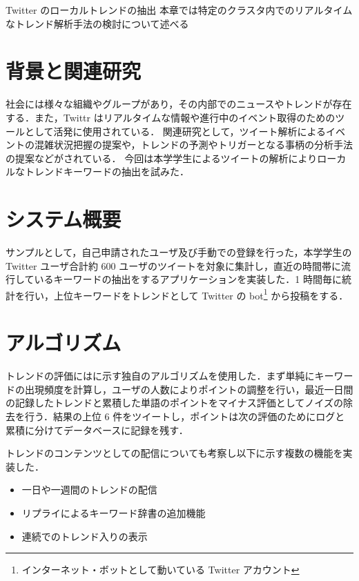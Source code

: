 \chapterhead
{Twitter のローカルトレンドの抽出}
{本章では特定のクラスタ内でのリアルタイムなトレンド解析手法の検討について述べる}


\section{背景と関連研究}

社会には様々な組織やグループがあり，その内部でのニュースやトレンドが存在する．また，Twittr はリアルタイムな情報や進行中のイベント取得のためのツールとして活発に使用されている．
関連研究として，ツイート解析によるイベントの混雑状況把握の提案\cite{socialevent}や，トレンドの予測やトリガーとなる事柄の分析手法の提案\cite{trendtrigger}などがされている．
今回は本学学生によるツイートの解析によりローカルなトレンドキーワードの抽出を試みた．

\section{システム概要}
サンプルとして，自己申請されたユーザ及び手動での登録を行った，本学学生の Twitter ユーザ合計約 600 ユーザのツイートを対象に集計し，直近の時間帯に流行しているキーワードの抽出をするアプリケーションを実装した．1 時間毎に統計を行い，上位キーワードをトレンドとして Twitter の bot\footnote{インターネット・ボットとして動いている Twitter アカウント} から投稿をする\cite{tdu_trend}．

\section{アルゴリズム}
トレンドの評価にはに示す独自のアルゴリズムを使用した．まず単純にキーワードの出現頻度を計算し，ユーザの人数によりポイントの調整を行い，最近一日間の記録したトレンドと累積した単語のポイントをマイナス評価としてノイズの除去を行う．結果の上位 6 件をツイートし，ポイントは次の評価のためにログと累積に分けてデータベースに記録を残す．


トレンドのコンテンツとしての配信についても考察し以下に示す複数の機能を実装した．
\begin{itemize}
    \item 一日や一週間のトレンドの配信
    \item リプライによるキーワード辞書の追加機能
    \item 連続でのトレンド入りの表示
\end{itemize}

